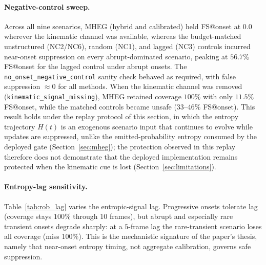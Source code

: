 \paragraph{Negative-control sweep.}
Across all nine scenarios, \mbox{MHEG} (hybrid and calibrated) held FS@onset at
$0.0$ wherever the kinematic channel was available, whereas the budget-matched
unstructured (NC2/NC6), random (NC1), and lagged (NC3) controls incurred
near-onset suppression on every abrupt-dominated scenario, peaking at
$56.7\%$ FS@onset for the lagged control under abrupt onsets. The
\texttt{no\_onset\_negative\_control} sanity check behaved as required, with
false suppression $\approx 0$ for all methods. When the kinematic channel was
removed (\texttt{kinematic\_signal\_missing}), \mbox{MHEG} retained coverage
$100\%$ with only $11.5\%$ FS@onset, while the matched controls became unsafe
($33$--$46\%$ FS@onset). {\color{\revcolor}This result holds under the replay
protocol of this section, in which the entropy trajectory $H(t)$ is an exogenous
scenario input that continues to evolve while updates are suppressed, unlike the
emitted-probability entropy consumed by the deployed gate
(Section~\ref{sec:mheg}); the protection observed in this replay therefore does
not demonstrate that the deployed implementation remains protected when the
kinematic cue is lost (Section~\ref{sec:limitations}).}


\paragraph{Entropy-lag sensitivity.}
Table~\ref{tab:rob_lag} varies the entropic-signal lag. Progressive onsets
tolerate lag (coverage stays $100\%$ through $10$ frames), but abrupt and
especially rare transient onsets degrade sharply: at a $5$-frame lag the
rare-transient scenario loses all coverage (miss $100\%$). This is the
mechanistic signature of the paper's thesis, namely that near-onset entropy
timing, not aggregate calibration, governs safe suppression.

